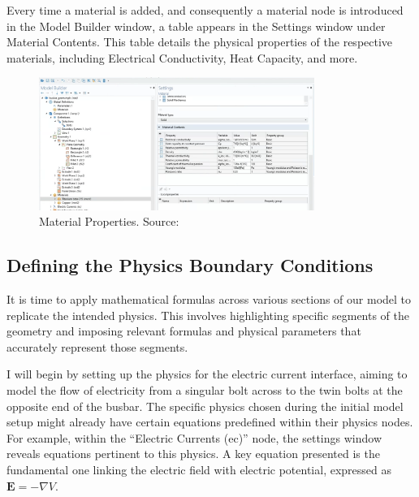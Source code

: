 Every time a material is added, and consequently a material node is introduced in the Model Builder window, a table appears in the Settings window under Material Contents. This table details the physical properties of the respective materials, including Electrical Conductivity, Heat Capacity, and more.

\begin{figure}[H]
  \centering
  \includegraphics[width=0.8\textwidth]{Chapters/Figures/Chapter 3 Figures/Material Contents in Settings Window.png}
  \caption{Material Properties. Source: \cite{multiphysics__modeling_nodate}}
  \label{fig: Material properties.}
\end{figure}

\subsection{Defining the Physics Boundary Conditions}
It is time to apply mathematical formulas across various sections of our model to replicate the intended physics. This involves highlighting specific segments of the geometry and imposing relevant formulas and physical parameters that accurately represent those segments.

I will begin by setting up the physics for the electric current interface, aiming to model the flow of electricity from a singular bolt across to the twin bolts at the opposite end of the busbar. The specific physics chosen during the initial model setup might already have certain equations predefined within their physics nodes. For example, within the ``Electric Currents (ec)'' node, the settings window reveals equations pertinent to this physics. A key equation presented is the fundamental one linking the electric field with electric potential, expressed as $\mathbf{E} = -\nabla V$.

